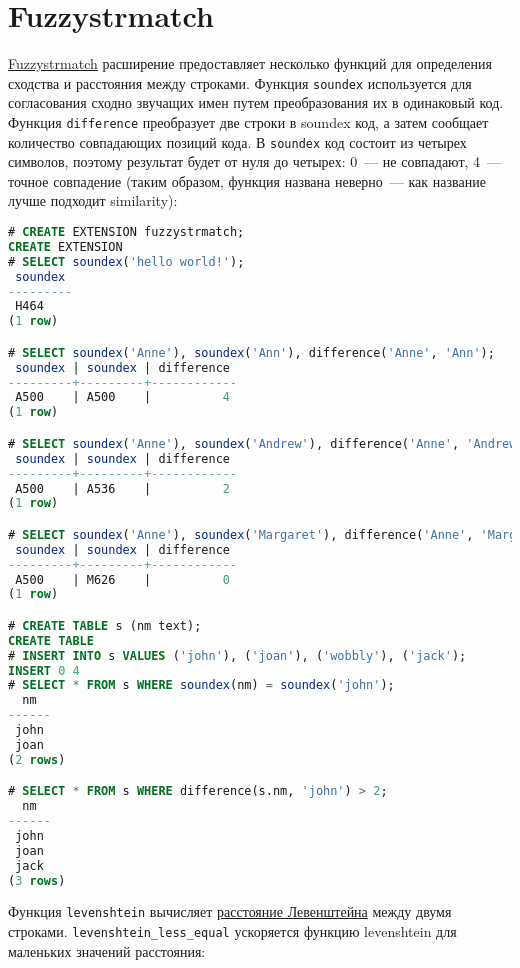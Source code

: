 \section{Fuzzystrmatch}

\href{https://www.postgresql.org/docs/current/static/fuzzystrmatch.html}{Fuzzystrmatch} расширение предоставляет несколько функций для определения сходства и расстояния между строками. Функция \lstinline!soundex! используется для согласования сходно звучащих имен путем преобразования их в одинаковый код. Функция \lstinline!difference! преобразует две строки в soundex код, а затем сообщает количество совпадающих позиций кода. В \lstinline!soundex! код состоит из четырех символов, поэтому результат будет от нуля до четырех: 0~--- не совпадают, 4~--- точное совпадение (таким образом, функция названа неверно~--- как название лучше подходит similarity):

\begin{lstlisting}[language=SQL,label=lst:ext_fuzzystrmatch1,caption=soundex]
# CREATE EXTENSION fuzzystrmatch;
CREATE EXTENSION
# SELECT soundex('hello world!');
 soundex
---------
 H464
(1 row)

# SELECT soundex('Anne'), soundex('Ann'), difference('Anne', 'Ann');
 soundex | soundex | difference
---------+---------+------------
 A500    | A500    |          4
(1 row)

# SELECT soundex('Anne'), soundex('Andrew'), difference('Anne', 'Andrew');
 soundex | soundex | difference
---------+---------+------------
 A500    | A536    |          2
(1 row)

# SELECT soundex('Anne'), soundex('Margaret'), difference('Anne', 'Margaret');
 soundex | soundex | difference
---------+---------+------------
 A500    | M626    |          0
(1 row)

# CREATE TABLE s (nm text);
CREATE TABLE
# INSERT INTO s VALUES ('john'), ('joan'), ('wobbly'), ('jack');
INSERT 0 4
# SELECT * FROM s WHERE soundex(nm) = soundex('john');
  nm
------
 john
 joan
(2 rows)

# SELECT * FROM s WHERE difference(s.nm, 'john') > 2;
  nm
------
 john
 joan
 jack
(3 rows)
\end{lstlisting}

Функция \lstinline!levenshtein! вычисляет \href{http://en.wikipedia.org/wiki/Levenshtein\_distance}{расстояние Левенштейна} между двумя строками. \lstinline!levenshtein_less_equal! ускоряется функцию levenshtein для маленьких значений расстояния:


